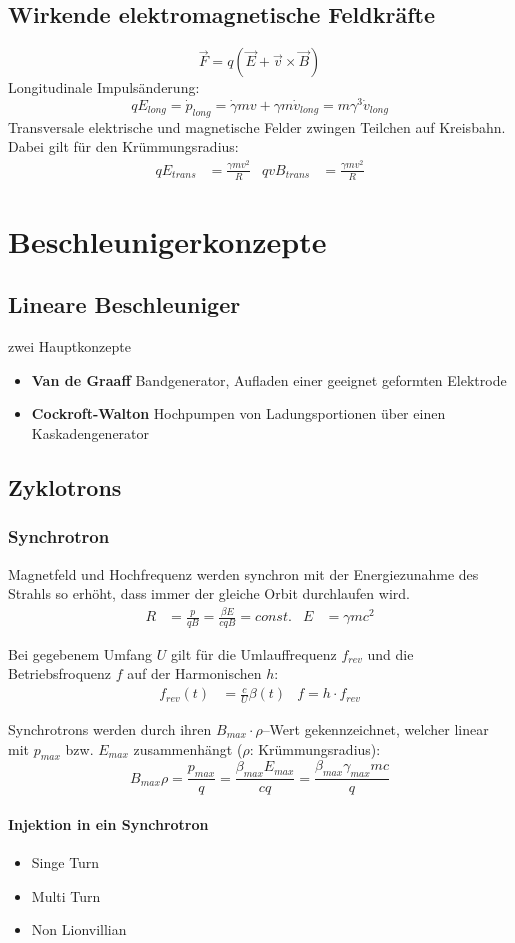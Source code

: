 \documentclass[12pt,DIV=15,a4paper,twoside,draft=false]{scrartcl}
\begin{document}
\subsection{Wirkende elektromagnetische Feldkräfte}
$$ \vec{F} = q (\vec{E} + \vec{v}\times \vec{B}) $$
Longitudinale Impulsänderung:
$$ qE_{long} = \dot{p}_{long} = \dot{γ} m v + γ m \dot{v}_{long} = m γ^3 \dot{v}_{long} $$
Transversale elektrische und magnetische Felder zwingen Teilchen auf Kreisbahn. Dabei gilt für den Krümmungsradius:
\begin{align*}
q E_{trans} &= \frac{γ m v^2}{R} &
q v B_{trans} &= \frac{γ m v^2}{R}
\end{align*}

\section{Beschleunigerkonzepte}
\subsection[LINAC]{Lineare Beschleuniger}
zwei Hauptkonzepte
\begin{itemize}
\item \textbf{Van de Graaff} Bandgenerator, Aufladen einer geeignet geformten Elektrode
\item \textbf{Cockroft-Walton} Hochpumpen von Ladungsportionen über einen Kaskadengenerator
\end{itemize}

\subsection{Zyklotrons}
\subsubsection{Synchrotron}
Magnetfeld und Hochfrequenz werden synchron mit der Energiezunahme des Strahls so erhöht, dass immer der gleiche Orbit durchlaufen wird.
\begin{align*}
R &= \frac{p}{qB} = \frac{β E}{c q B} = const. &
E &= γmc^2
\end{align*}

Bei gegebenem Umfang $U$ gilt für die Umlauffrequenz $f_{rev}$ und die Betriebsfroquenz $f$ auf der Harmonischen $h$:
\begin{align*}
 f_{rev}(t) &= \frac{c}{U} β(t) &
 f = h \cdot f_{rev}
\end{align*}

Synchrotrons werden durch ihren $B_{max}\cdot ρ$--Wert gekennzeichnet, welcher linear mit $p_{max}$ bzw. $E_{max}$ zusammenhängt ($ρ$: Krümmungsradius):
$$ B_{max} ρ = \frac{p_{max}}{q} = \frac{β_{max} E_{max}}{cq} = \frac{β_{max} γ_{max} mc}{q} $$


\paragraph{Injektion in ein Synchrotron}
\begin{itemize}
\item Singe Turn
\item Multi Turn
\item Non Lionvillian
\end{itemize}
\end{document}

